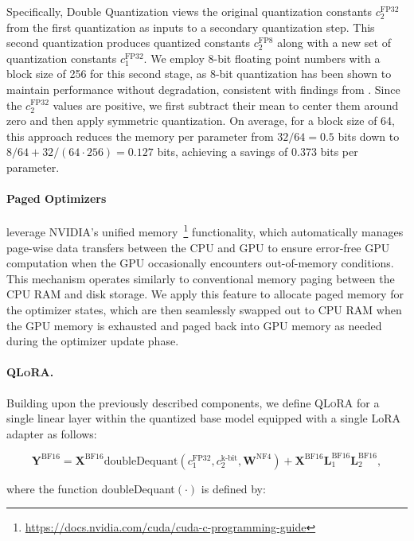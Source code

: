 Specifically, Double Quantization views the original quantization constants $c_2^{\text{FP32}}$ from the first quantization as inputs to a secondary quantization step. This second quantization produces quantized constants $c_2^{\text{FP8}}$ along with a new set of quantization constants $c_1^{\text{FP32}}$. We employ 8-bit floating point numbers with a block size of 256 for this second stage, as 8-bit quantization has been shown to maintain performance without degradation, consistent with findings from \citet{dettmers2022case}. Since the $c_2^{\text{FP32}}$ values are positive, we first subtract their mean to center them around zero and then apply symmetric quantization. On average, for a block size of 64, this approach reduces the memory per parameter from $32/64 = 0.5$ bits down to $8/64 + 32/(64 \cdot 256) = 0.127$ bits, achieving a savings of 0.373 bits per parameter.

\paragraph{Paged Optimizers} leverage NVIDIA's unified memory~\footnote{\tiny \url{https://docs.nvidia.com/cuda/cuda-c-programming-guide}} functionality, which automatically manages page-wise data transfers between the CPU and GPU to ensure error-free GPU computation when the GPU occasionally encounters out-of-memory conditions. This mechanism operates similarly to conventional memory paging between the CPU RAM and disk storage. We apply this feature to allocate paged memory for the optimizer states, which are then seamlessly swapped out to CPU RAM when the GPU memory is exhausted and paged back into GPU memory as needed during the optimizer update phase.

\paragraph{\textsc{QLoRA}.} Building upon the previously described components, we define \textsc{QLoRA} for a single linear layer within the quantized base model equipped with a single LoRA adapter as follows:

\begin{equation}
    \mathbf{Y}^{\text{BF16}} =  \mathbf{X}^{\text{BF16}} \text{doubleDequant}(c_1^{\text{FP32}}, c_2^{\text{k-bit}}, \mathbf{W}^{\text{NF4}}) + \mathbf{X}^{\text{BF16}}\mathbf{L}^{\text{BF16}}_1\mathbf{L}^{\text{BF16}}_2,
\end{equation}

where the function doubleDequant$(\cdot)$ is defined by:


